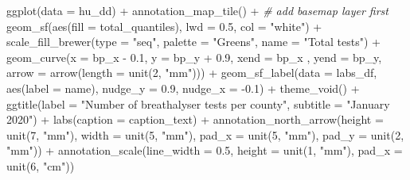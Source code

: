 \documentclass[
]{book}
\makeatletter
\newenvironment{Shaded}{\begin{snugshade}}{\end{snugshade}}
\newcommand{\AttributeTok}[1]{\textcolor[rgb]{0.61,0.61,0.61}{#1}}
\newcommand{\CommentTok}[1]{\textcolor[rgb]{0.37,0.37,0.37}{\textit{#1}}}
\newcommand{\DecValTok}[1]{\textcolor[rgb]{0.06,0.06,0.06}{#1}}
\newcommand{\FloatTok}[1]{\textcolor[rgb]{0.06,0.06,0.06}{#1}}
\newcommand{\FunctionTok}[1]{\textcolor[rgb]{0,0,0}{#1}}
\newcommand{\NormalTok}[1]{#1}
\newcommand{\SpecialCharTok}[1]{\textcolor[rgb]{0,0,0}{#1}}
\newcommand{\StringTok}[1]{\textcolor[rgb]{0.5,0.5,0.5}{#1}}
\newenvironment{kframe}{%
\medskip{}
\setlength{\fboxsep}{.8em}
 \def\at@end@of@kframe{}%
 \ifinner\ifhmode%
  \def\at@end@of@kframe{\end{minipage}}%
  \begin{minipage}{\columnwidth}%
 \fi\fi%
 \def\FrameCommand##1{\hskip\@totalleftmargin \hskip-\fboxsep
 \colorbox{shadecolor}{##1}\hskip-\fboxsep
     \hskip-\linewidth \hskip-\@totalleftmargin \hskip\columnwidth}%
 \MakeFramed {\advance\hsize-\width
   \@totalleftmargin\z@ \linewidth\hsize
   \@setminipage}}%
 {\par\unskip\endMakeFramed%
 \at@end@of@kframe}
\renewenvironment{Shaded}{\begin{kframe}}{\end{kframe}}
\makeatother
\begin{document}
\begin{Shaded}
\begin{Highlighting}[]
\FunctionTok{ggplot}\NormalTok{(}\AttributeTok{data =}\NormalTok{ hu\_dd) }\SpecialCharTok{+} 
  \FunctionTok{annotation\_map\_tile}\NormalTok{() }\SpecialCharTok{+}  \CommentTok{\# add basemap layer first}
  \FunctionTok{geom\_sf}\NormalTok{(}\FunctionTok{aes}\NormalTok{(}\AttributeTok{fill =}\NormalTok{ total\_quantiles), }
          \AttributeTok{lwd =} \FloatTok{0.5}\NormalTok{, }\AttributeTok{col =} \StringTok{"white"}\NormalTok{) }\SpecialCharTok{+} 
  \FunctionTok{scale\_fill\_brewer}\NormalTok{(}\AttributeTok{type =} \StringTok{"seq"}\NormalTok{, }
                    \AttributeTok{palette =} \StringTok{"Greens"}\NormalTok{, }
                    \AttributeTok{name =} \StringTok{"Total tests"}\NormalTok{) }\SpecialCharTok{+} 
  \FunctionTok{geom\_curve}\NormalTok{(}\AttributeTok{x =}\NormalTok{ bp\_x }\SpecialCharTok{{-}} \FloatTok{0.1}\NormalTok{, }
             \AttributeTok{y =}\NormalTok{ bp\_y }\SpecialCharTok{+} \FloatTok{0.9}\NormalTok{, }
             \AttributeTok{xend =}\NormalTok{ bp\_x , }
             \AttributeTok{yend =}\NormalTok{ bp\_y, }
             \AttributeTok{arrow =} \FunctionTok{arrow}\NormalTok{(}\AttributeTok{length =} \FunctionTok{unit}\NormalTok{(}\DecValTok{2}\NormalTok{, }\StringTok{"mm"}\NormalTok{))) }\SpecialCharTok{+}
  \FunctionTok{geom\_sf\_label}\NormalTok{(}\AttributeTok{data =}\NormalTok{ labs\_df, }
                \FunctionTok{aes}\NormalTok{(}\AttributeTok{label =}\NormalTok{ name), }
                \AttributeTok{nudge\_y =} \FloatTok{0.9}\NormalTok{, }
                \AttributeTok{nudge\_x =} \SpecialCharTok{{-}}\FloatTok{0.1}\NormalTok{) }\SpecialCharTok{+} 
  \FunctionTok{theme\_void}\NormalTok{() }\SpecialCharTok{+} 
  \FunctionTok{ggtitle}\NormalTok{(}\AttributeTok{label =} \StringTok{"Number of breathalyser tests per county"}\NormalTok{, }
          \AttributeTok{subtitle =} \StringTok{"January 2020"}\NormalTok{) }\SpecialCharTok{+} 
  \FunctionTok{labs}\NormalTok{(}\AttributeTok{caption =}\NormalTok{ caption\_text) }\SpecialCharTok{+} 
  \FunctionTok{annotation\_north\_arrow}\NormalTok{(}\AttributeTok{height =} \FunctionTok{unit}\NormalTok{(}\DecValTok{7}\NormalTok{, }\StringTok{"mm"}\NormalTok{), }
                         \AttributeTok{width =} \FunctionTok{unit}\NormalTok{(}\DecValTok{5}\NormalTok{, }\StringTok{"mm"}\NormalTok{), }
                         \AttributeTok{pad\_x =} \FunctionTok{unit}\NormalTok{(}\DecValTok{5}\NormalTok{, }\StringTok{"mm"}\NormalTok{), }
                         \AttributeTok{pad\_y =} \FunctionTok{unit}\NormalTok{(}\DecValTok{2}\NormalTok{, }\StringTok{"mm"}\NormalTok{)) }\SpecialCharTok{+} 
  \FunctionTok{annotation\_scale}\NormalTok{(}\AttributeTok{line\_width =} \FloatTok{0.5}\NormalTok{, }
                   \AttributeTok{height =} \FunctionTok{unit}\NormalTok{(}\DecValTok{1}\NormalTok{, }\StringTok{"mm"}\NormalTok{), }
                   \AttributeTok{pad\_x =} \FunctionTok{unit}\NormalTok{(}\DecValTok{6}\NormalTok{, }\StringTok{"cm"}\NormalTok{)) }
\end{Highlighting}
\end{Shaded}
\end{document}
